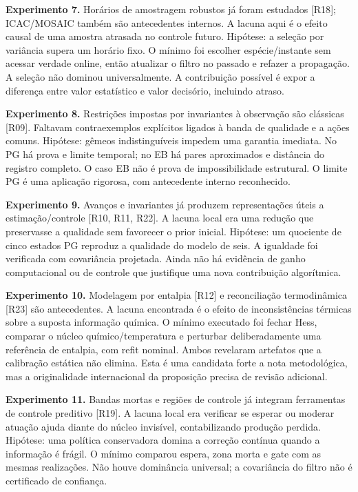 \documentclass[
  11pt,
  letterpaper,
]{article}
\begin{document}
\textbf{Experimento 7.} Horários de amostragem robustos já foram
estudados {[}R18{]}; ICAC/MOSAIC também são antecedentes internos. A
lacuna aqui é o efeito causal de uma amostra atrasada no controle
futuro. Hipótese: a seleção por variância supera um horário fixo. O
mínimo foi escolher espécie/instante sem acessar verdade online, então
atualizar o filtro no passado e refazer a propagação. A seleção não
dominou universalmente. A contribuição possível é expor a diferença
entre valor estatístico e valor decisório, incluindo atraso.

\textbf{Experimento 8.} Restrições impostas por invariantes à observação
são clássicas {[}R09{]}. Faltavam contraexemplos explícitos ligados à
banda de qualidade e a ações comuns. Hipótese: gêmeos indistinguíveis
impedem uma garantia imediata. No PG há prova e limite temporal; no EB
há pares aproximados e distância do registro completo. O caso EB não é
prova de impossibilidade estrutural. O limite PG é uma aplicação
rigorosa, com antecedente interno reconhecido.

\textbf{Experimento 9.} Avanços e invariantes já produzem representações
úteis a estimação/controle {[}R10, R11, R22{]}. A lacuna local era uma
redução que preservasse a qualidade sem favorecer o prior inicial.
Hipótese: um quociente de cinco estados PG reproduz a qualidade do
modelo de seis. A igualdade foi verificada com covariância projetada.
Ainda não há evidência de ganho computacional ou de controle que
justifique uma nova contribuição algorítmica.

\textbf{Experimento 10.} Modelagem por entalpia {[}R12{]} e
reconciliação termodinâmica {[}R23{]} são antecedentes. A lacuna
encontrada é o efeito de inconsistências térmicas sobre a suposta
informação química. O mínimo executado foi fechar Hess, comparar o
núcleo químico/temperatura e perturbar deliberadamente uma referência de
entalpia, com refit nominal. Ambos revelaram artefatos que a calibração
estática não elimina. Esta é uma candidata forte a nota metodológica,
mas a originalidade internacional da proposição precisa de revisão
adicional.

\textbf{Experimento 11.} Bandas mortas e regiões de controle já integram
ferramentas de controle preditivo {[}R19{]}. A lacuna local era
verificar se esperar ou moderar atuação ajuda diante do núcleo
invisível, contabilizando produção perdida. Hipótese: uma política
conservadora domina a correção contínua quando a informação é frágil. O
mínimo comparou espera, zona morta e gate com as mesmas realizações. Não
houve dominância universal; a covariância do filtro não é certificado de
confiança.
\end{document}
